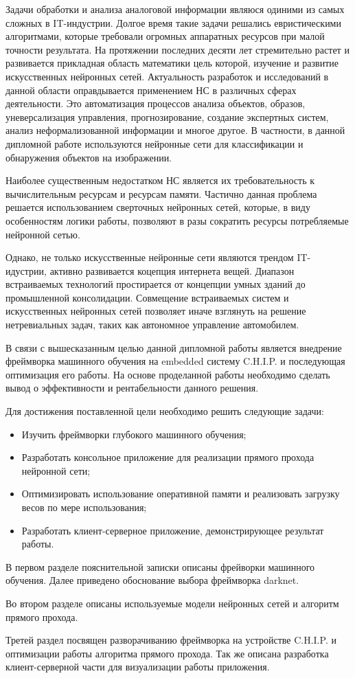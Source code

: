 \documentclass[a4paper,english,russian]{G2-105}
\begin{document}
\par Задачи обработки и анализа аналоговой информации являюся одиними из самых сложных в IT-индустрии. Долгое
время такие задачи решались евристическими алгоритмами, которые требовали огромных аппаратных ресурсов при малой точности результата. На протяжении последних десяти лет стремительно растет и развивается прикладная область математики цель которой, изучение и развитие искусственных нейронных сетей. Актуальность разработок и исследований в данной области оправдывается применением НС в различных сферах деятельности. Это автоматизация процессов анализа объектов, образов, уневерсализация управления, прогнозирование, создание экспертных систем, анализ неформализованной информации и многое другое. В частности, в данной дипломной работе используются нейронные сети для классификации и обнаружения объектов на изображении. 
\par Наиболее существенным недостатком НС является их требовательность к вычислительным ресурсам и ресурсам памяти. Частично данная проблема решается использованием сверточных нейронных сетей, которые, в виду особенностям логики работы, позволяют в разы сократить ресурсы потребляемые нейронной сетью.
\par Однако, не только искусственные нейронные сети являются трендом IT-идустрии, активно развивается коцепция интернета вещей. Диапазон встраиваемых технологий простирается от концепции умных зданий до промышленной консолидации. Совмещение встраиваемых систем и искусственных нейронных сетей позволяет иначе взглянуть на решение нетревиальных задач, таких как автономное управление автомобилем.
\par В связи с вышесказанным целью данной дипломной работы является внедрение фреймворка машинного обучения на embedded систему C.H.I.P. и последующая оптимизация его работы. На основе проделанной работы необходимо сделать вывод о эффективности и рентабельности данного решения. 
\par Для достижения поставленной цели необходимо решить следующие задачи:
\begin{itemize}
\item Изучить фреймворки глубокого машинного обучения;
\item Разработать консольное приложение для реализации прямого прохода нейронной сети;
\item Оптимизировать использование оперативной памяти и реализовать загрузку весов по мере использования;
\item Разработать клиент-серверное приложение, демонстрирующее результат работы.
\end{itemize}
\par В первом разделе пояснительной записки описаны фрейворки машинного обучения. Далее приведено обоснование выбора фреймворка darknet.
\par Во втором разделе описаны используемые модели нейронных сетей и алгоритм прямого прохода.
\par Третей раздел посвящен разворачиванию фреймворка на устройстве C.H.I.P. и оптимизации работы алгоритма прямого прохода. Так же описана разработка клиент-серверной части для визуализации работы приложения. 
\newpage
\end{document}
